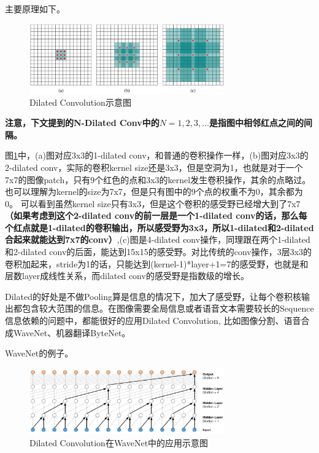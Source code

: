 主要原理如下。

\begin{figure}[!hbtp]
\centering
\includegraphics[width=0.75\textwidth]{DLTips/DilatedConv1}
\caption{Dilated Convolution示意图}
\label{DilatedConv1}
\end{figure}

{\bfseries 注意，下文提到的N-Dilated Conv中的$N={1, 2, 3, \ldots}$是指图中相邻红点之间的间隔。}

图\ref{DilatedConv1}中，(a)图对应3x3的1-dilated conv，和普通的卷积操作一样，(b)图对应3x3的2-dilated conv，实际的卷积kernel size还是3x3，但是空洞为1，也就是对于一个7x7的图像patch，只有9个红色的点和3x3的kernel发生卷积操作，其余的点略过。也可以理解为kernel的size为7x7，但是只有图中的9个点的权重不为0，其余都为0。 可以看到虽然kernel size只有3x3，但是这个卷积的感受野已经增大到了7x7{\bfseries（如果考虑到这个2-dilated conv的前一层是一个1-dilated conv的话，那么每个红点就是1-dilated的卷积输出，所以感受野为3x3，所以1-dilated和2-dilated合起来就能达到7x7的conv）},(c)图是4-dilated conv操作，同理跟在两个1-dilated和2-dilated conv的后面，能达到15x15的感受野。对比传统的conv操作，3层3x3的卷积加起来，stride为1的话，只能达到(kernel-1)*layer+1=7的感受野，也就是和层数layer成线性关系，而dilated conv的感受野是指数级的增长。

Dilated的好处是不做Pooling算是信息的情况下，加大了感受野，让每个卷积核输出都包含较大范围的信息。在图像需要全局信息或者语音文本需要较长的Sequence信息依赖的问题中，都能很好的应用Dilated Convolution, 比如图像分割、语音合成WaveNet、机器翻译ByteNet。

WaveNet的例子。
\begin{figure}[!hbtp]
\centering
\includegraphics[width=0.75\textwidth]{DLTips/WaveNet1}
\caption{Dilated Convolution在WaveNet中的应用示意图}
\label{WaveNet1}
\end{figure}

